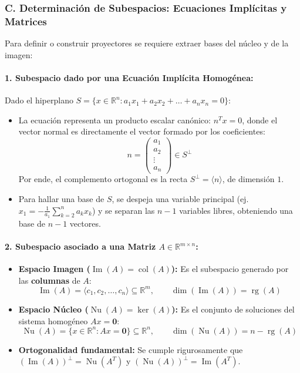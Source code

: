 \documentclass[11pt,a4paper]{article}
\begin{document}
\subsubsection*{C. Determinación de Subespacios: Ecuaciones Implícitas y Matrices}
Para definir o construir proyectores se requiere extraer bases del núcleo y de la imagen:

\paragraph{1. Subespacio dado por una Ecuación Implícita Homogénea:}
Dado el hiperplano $S = \{x \in \mathbb{R}^n : a_1 x_1 + a_2 x_2 + \dots + a_n x_n = 0\}$:
\begin{itemize}
    \item La ecuación representa un producto escalar canónico: $n^T x = 0$, donde el vector normal es directamente el vector formado por los coeficientes:
    \[
    n = \begin{pmatrix} a_1 \\ a_2 \\ \vdots \\ a_n \end{pmatrix} \in S^\perp
    \]
    Por ende, el complemento ortogonal es la recta $S^\perp = \langle n \rangle$, de dimensión $1$.
    \item Para hallar una base de $S$, se despeja una variable principal (ej. $x_1 = -\frac{1}{a_1}\sum_{k=2}^n a_k x_k$) y se separan las $n-1$ variables libres, obteniendo una base de $n-1$ vectores.
\end{itemize}

\paragraph{2. Subespacio asociado a una Matriz $A \in \mathbb{R}^{m \times n}$:}
\begin{itemize}
    \item \textbf{Espacio Imagen ($\operatorname{Im}(A) = \operatorname{col}(A)$):} Es el subespacio generado por las \textbf{columnas} de $A$:
    \[
    \operatorname{Im}(A) = \langle c_1, c_2, \dots, c_n \rangle \subseteq \mathbb{R}^m, \qquad \dim(\operatorname{Im}(A)) = \operatorname{rg}(A)
    \]
    \item \textbf{Espacio Núcleo ($\operatorname{Nu}(A) = \ker(A)$):} Es el conjunto de soluciones del sistema homogéneo $A x = \mathbf{0}$:
    \[
    \operatorname{Nu}(A) = \{x \in \mathbb{R}^n : A x = \mathbf{0}\} \subseteq \mathbb{R}^n, \qquad \dim(\operatorname{Nu}(A)) = n - \operatorname{rg}(A)
    \]
    \item \textbf{Ortogonalidad fundamental:} Se cumple rigurosamente que $(\operatorname{Im}(A))^\perp = \operatorname{Nu}(A^T)$ y $(\operatorname{Nu}(A))^\perp = \operatorname{Im}(A^T)$.
\end{itemize}
\end{document}
